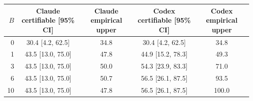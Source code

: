 \begin{tabular}{@{}rcccc@{}}
\toprule
$B$ & Claude certifiable [95\% CI] & Claude empirical upper & Codex certifiable [95\% CI] & Codex empirical upper \\
\midrule
0 & 30.4 [4.2, 62.5] & 34.8 & 30.4 [4.2, 62.5] & 34.8 \\
1 & 43.5 [13.0, 75.0] & 47.8 & 44.9 [15.2, 78.3] & 49.3 \\
3 & 43.5 [13.0, 75.0] & 50.0 & 54.3 [23.9, 83.3] & 71.0 \\
6 & 43.5 [13.0, 75.0] & 50.7 & 56.5 [26.1, 87.5] & 93.5 \\
10 & 43.5 [13.0, 75.0] & 47.8 & 56.5 [26.1, 87.5] & 100.0 \\
\bottomrule
\end{tabular}

